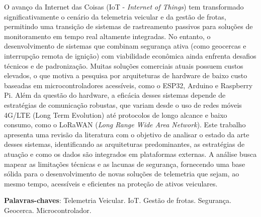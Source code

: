 \documentclass[
	article,			%
	11pt,				%
	oneside,			%
	a4paper,			%
	english,			%
	brazil,				%
	sumario=tradicional
	]{abntex2}
\begin{document}
\frenchspacing


%
%
\maketitle

\begin{resumoumacoluna}
   O avanço da Internet das Coisas (IoT - \textit{Internet of Things}) tem transformado significativamente o cenário da telemetria veicular e da gestão de frotas, permitindo uma transição de sistemas de rastreamento passivos para soluções de monitoramento em tempo real altamente integradas. No entanto, o desenvolvimento de sistemas que combinam segurança ativa (como geocercas e interrupção remota de ignição) com viabilidade econômica ainda enfrenta desafios técnicos e de padronização. Muitas soluções comerciais atuais possuem custos elevados, o que motiva a pesquisa por arquiteturas de hardware de baixo custo baseadas em microcontroladores acessíveis, como o ESP32, Arduino e Raspberry Pi. Além da questão do hardware, a eficácia desses sistemas depende de estratégias de comunicação robustas, que variam desde o uso de redes móveis 4G/LTE (Long Term Evolution) até protocolos de longo alcance e baixo consumo, como o LoRaWAN (\textit{Long Range Wide Area Network}). Este trabalho apresenta uma revisão da literatura com o objetivo de analisar o estado da arte desses sistemas, identificando as arquiteturas predominantes, as estratégias de atuação e como os dados são integrados em plataformas externas. A análise busca mapear as limitações técnicas e as lacunas de segurança, fornecendo uma base sólida para o desenvolvimento de novas soluções de telemetria que sejam, ao mesmo tempo, acessíveis e eficientes na proteção de ativos veiculares.

   \vspace{\onelineskip}

   \noindent
   \textbf{Palavras-chaves}: Telemetria Veicular. IoT. Gestão de frotas. Segurança. Geocerca. Microcontrolador.
\end{resumoumacoluna}
\end{document}
